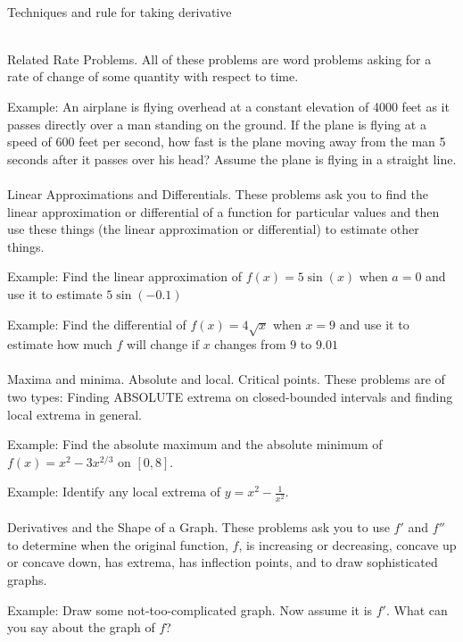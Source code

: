 \documentclass[11pt,fleqn]{article}
\begin{document}
\noindent {}\\
Techniques and rule for taking derivative

\noindent {}\\
Related Rate Problems. All of these problems are word problems asking for a rate of change of some quantity with respect to time. 

Example:  An airplane is flying overhead at a constant elevation of 4000 feet as it passes directly over a man standing on the ground. If the plane is flying at a speed of 600 feet per second, how fast is the plane moving away from the man 5 seconds after it passes over his head? Assume the plane is flying in a straight line.\\

\noindent {}\\
Linear Approximations and Differentials. These problems ask you to find the linear approximation or differential of a function for particular values and then use these things (the linear approximation or differential) to estimate other things.

Example:  Find the linear approximation of $f(x)=5 \sin (x)$ when $a=0$ and use it to estimate $5 \sin (-0.1)$

Example:  Find the differential of $f(x)=4 \sqrt{x}$ when $x=9$ and use it to estimate  how much $f$ will change if $x$ changes from $9$ to $9.01$\\


\noindent {}\\
Maxima and minima. Absolute and local. Critical points. These problems are of two types: Finding ABSOLUTE extrema on closed-bounded intervals and finding local extrema in general.

Example: Find the absolute maximum and the absolute minimum of $f(x)=x^2-3x^{2/3}$ on $[0,8].$

Example: Identify any local extrema of $y=x^2- \frac{1}{x^2}.$\\

\noindent {}\\
Derivatives and the Shape of a Graph. These problems ask you to use $f'$ and $f''$ to determine when the original function, $f$, is increasing or decreasing, concave up or concave down, has extrema, has inflection points, and to draw sophisticated graphs.

Example: Draw some not-too-complicated graph. Now assume it is $f'$. What can you say about the graph of $f$?
\end{document}

